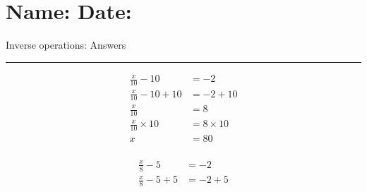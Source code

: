 \documentclass[12pt]{article}
\def \HeadingAnswers {\section*{\Large Name: \underline{\hspace{8cm}} \hfill Date: \underline{\hspace{3cm}}} \vspace{-3mm}
{Inverse operations: Answers} \vspace{1pt}\hrule}
\newcounter{minipagecount}
\begin{document}
\HeadingAnswers
\vspace{1mm}
\begin{multicols}{2}
\noindent{(\theminipagecount)}\hspace{0.1mm} %
\begin{minipage}[t]{0.45\textwidth} %
    \vspace{-26pt}  %
    \raggedright %
    \begin{align*} %
        \frac{x}{10} - 10 &= -2\\
        \frac{x}{10} - 10 + 10 &= -2 + 10\\
        \frac{x}{10} &= 8\\
        \frac{x}{10} \times10 &= 8 \times10\\
        x &= 80\\
    \end{align*}
\end{minipage} %
\noindent{(\theminipagecount)}\hspace{0.1mm} %
\begin{minipage}[t]{0.45\textwidth} %
    \vspace{-26pt}  %
    \raggedright %
    \begin{align*} %
        \frac{x}{8} - 5 &= -2\\
        \frac{x}{8} - 5 + 5 &= -2 + 5\\

\end{align*}
\end{minipage}
\end{multicols}
\end{document}
